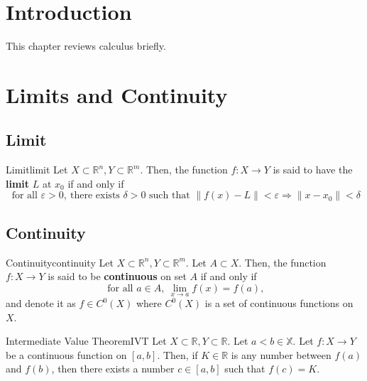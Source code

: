 \section{Introduction}
    This chapter reviews calculus briefly.

\section{Limits and Continuity}
    \subsection{Limit}
        \begin{defn}{Limit}{limit}
            Let $X \subset \mathbb{R}^n, Y \subset \mathbb{R}^m$.
            Then, the function $f:X \to Y$ is said to have the \textbf{limit} $L$ at $x_0$ if and only if
            \begin{equation}
                \text{ for all } \varepsilon > 0,\ \text{there exists } \delta > 0 \text{ such that } \|f(x) - L\| < \varepsilon \Rightarrow \|x - x_0\| < \delta 
            \end{equation}
        \end{defn}
    \subsection{Continuity}
        \begin{defn}{Continuity}{continuity}
            Let $X \subset \mathbb{R}^n, Y \subset \mathbb{R}^m$. Let $A \subset X$.
            Then, the function $f:X \to Y$ is said to be \textbf{continuous} on set $A$ if and only if
            \begin{equation}
                \text{ for all } a \in A,\ \lim_{x \to a}f(x) = f(a),
            \end{equation}
            and denote it as $f \in C^0(X)$ where $C^0(X)$ is a set of continuous functions on $X$.
        \end{defn}

        \begin{thm}{Intermediate Value Theorem}{IVT}
            Let $X \subset \mathbb{R}, Y \subset \mathbb{R}$. Let $a < b \in \mathbb{X}$. Let $f:X \to Y$ be a continuous function on $[a, b]$.
            Then, if $K \in \mathbb{R}$ is any number between $f(a)$ and $f(b)$, then there exists a number $c\in[a,b]$ such that $f(c)=K$.
        \end{thm}